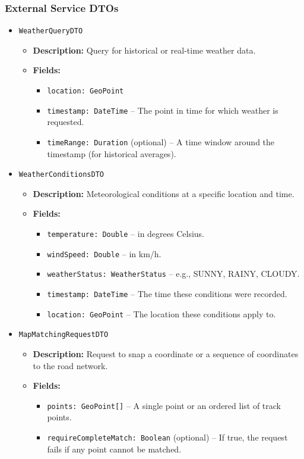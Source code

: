 \subsubsection{External Service DTOs}

\begin{itemize}
    \item \texttt{WeatherQueryDTO}
    \begin{itemize}
        \item \textbf{Description:} Query for historical or real-time weather data.
        \item \textbf{Fields:}
        \begin{itemize}
            \item \texttt{location: GeoPoint}
            \item \texttt{timestamp: DateTime} – The point in time for which weather is requested.
            \item \texttt{timeRange: Duration} (optional) – A time window around the timestamp (for historical averages).
        \end{itemize}
    \end{itemize}

    \item \texttt{WeatherConditionsDTO}
    \begin{itemize}
        \item \textbf{Description:} Meteorological conditions at a specific location and time.
        \item \textbf{Fields:}
        \begin{itemize}
            \item \texttt{temperature: Double} – in degrees Celsius.
            \item \texttt{windSpeed: Double} – in km/h.
            \item \texttt{weatherStatus: WeatherStatus} – e.g., SUNNY, RAINY, CLOUDY.
            \item \texttt{timestamp: DateTime} – The time these conditions were recorded.
            \item \texttt{location: GeoPoint} – The location these conditions apply to.
        \end{itemize}
    \end{itemize}

    \item \texttt{MapMatchingRequestDTO}
    \begin{itemize}
        \item \textbf{Description:} Request to snap a coordinate or a sequence of coordinates to the road network.
        \item \textbf{Fields:}
        \begin{itemize}
            \item \texttt{points: GeoPoint[]} – A single point or an ordered list of track points.
            \item \texttt{requireCompleteMatch: Boolean} (optional) – If true, the request fails if any point cannot be matched.
        \end{itemize}
    \end{itemize}


\end{itemize}
